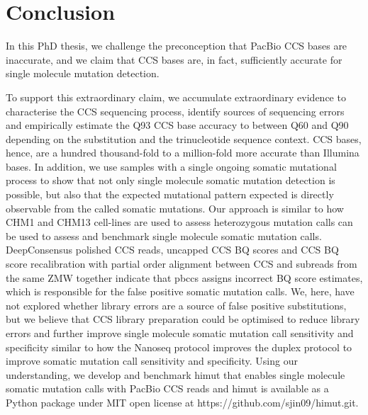 \section{Conclusion}


In this PhD thesis, we challenge the preconception that PacBio CCS bases are inaccurate, and we claim that CCS bases are, in fact, sufficiently accurate for single molecule mutation detection. 

To support this extraordinary claim, we accumulate extraordinary evidence to characterise the CCS sequencing process, identify sources of sequencing errors and empirically estimate the Q93 CCS base accuracy to between Q60 and Q90 depending on the substitution and the trinucleotide sequence context. CCS bases, hence, are a hundred thousand-fold to a million-fold more accurate than Illumina bases. In addition, we use samples with a single ongoing somatic mutational process to show that not only single molecule somatic mutation detection is possible, but also that the expected mutational pattern expected is directly observable from the called somatic mutations. Our approach is similar to how CHM1 and CHM13 cell-lines are used to assess heterozygous mutation calls can be used to assess and benchmark single molecule somatic mutation calls. DeepConsensus polished CCS reads, uncapped CCS BQ scores and CCS BQ score recalibration with partial order alignment between CCS and subreads from the same ZMW together indicate that pbccs assigns incorrect BQ score estimates, which is responsible for the false positive somatic mutation calls. We, here, have not explored whether library errors are a source of false positive substitutions, but we believe that CCS library preparation could be optimised to reduce library errors and further improve single molecule somatic mutation call sensitivity and specificity similar to how the Nanoseq protocol improves the duplex protocol to improve somatic mutation call sensitivity and specificity. Using our understanding, we develop and benchmark himut that enables single molecule somatic mutation calls with PacBio CCS reads and himut is available as a Python package under MIT open license at https://github.com/sjin09/himut.git.

